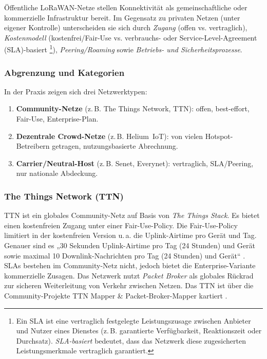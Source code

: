 \label{sec:ttn}

Öffentliche LoRaWAN-Netze stellen Konnektivität als gemeinschaftliche oder kommerzielle Infrastruktur bereit. Im Gegensatz zu privaten Netzen (unter eigener Kontrolle) unterscheiden sie sich durch \emph{Zugang} (offen vs. vertraglich), \emph{Kostenmodell} (kostenfrei/Fair-Use vs. verbrauchs- oder Service-Level-Agreement (SLA)-basiert \footnote{Ein SLA ist eine vertraglich festgelegte Leistungszusage zwischen Anbieter und Nutzer eines Dienstes (z.\,B. garantierte Verfügbarkeit, Reaktionszeit oder Durchsatz). \emph{SLA-basiert} bedeutet, dass das Netzwerk diese zugesicherten Leistungsmerkmale vertraglich garantiert.}), \emph{Peering/Roaming} sowie \emph{Betriebs- und Sicherheitsprozesse}. 
\autocite{LoRaWANBackendInterfaces11, RP002104, ETSIEN3002202025}

\subsubsection*{Abgrenzung und Kategorien}
In der Praxis zeigen sich drei Netzwerktypen:

\begin{enumerate}
  \item \textbf{Community-Netze} (z.\,B. The Things Network, TTN): offen, best-effort, Fair-Use, Enterprise-Plan.
  \item \textbf{Dezentrale Crowd-Netze} (z.\,B. Helium~IoT): von vielen Hotspot-Betreibern getragen, nutzungsbasierte Abrechnung.
  \item \textbf{Carrier/Neutral-Host} (z.\,B. Senet, Everynet): vertraglich, SLA/Peering, nur nationale Abdeckung.
\end{enumerate}

\subsubsection*{The Things Network (TTN)}
TTN ist ein globales Community-Netz auf Basis von \emph{The Things Stack}. Es bietet einen kostenfreien Zugang unter einer Fair-Use-Policy. Die Fair-Use-Policy limitiert in der kostenfreien Version u.\,a. die Uplink-Airtime pro Gerät und Tag. Genauer sind es „30 Sekunden Uplink-Airtime pro Tag (24 Stunden) und Gerät sowie maximal 10 Downlink-Nachrichten pro Tag (24 Stunden) und Gerät“ \autocite{DutyCycleTTN}. SLAs bestehen im Community-Netz nicht, jedoch bietet die Enterprise-Variante kommerzielle Zusagen. Das Netzwerk nutzt \emph{Packet Broker} als globales Rückrad zur sicheren Weiterleitung von Verkehr zwischen Netzen. Das TTN ist über die Community-Projekte TTN Mapper \& Packet-Broker-Mapper kartiert \autocite{TTNFairUse, PacketBroker, TTNMapperDoc}.  

